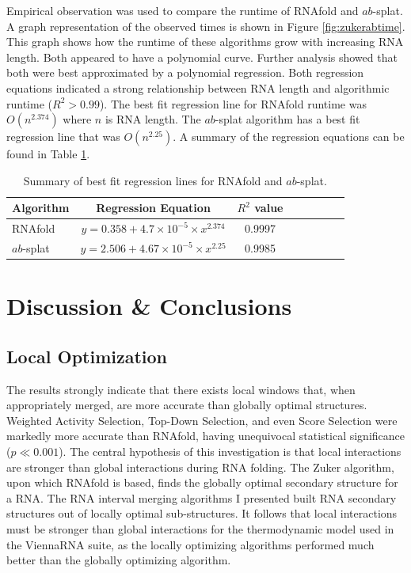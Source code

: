 \documentclass{cshonours}
\begin{document}
Empirical observation was used to compare the runtime of RNAfold and $ab$-splat. A graph representation of the observed times is shown in Figure \ref{fig:zukerabtime}. This graph shows how the runtime of these algorithms grow with increasing RNA length. Both appeared to have a polynomial curve. Further analysis showed that both were best approximated by a polynomial regression. Both regression equations indicated a strong relationship between RNA length and algorithmic runtime ($R^2 > 0.99$). The best fit regression line for RNAfold runtime was $O(n^{2.374})$ where $n$ is RNA length. The $ab$-splat algorithm has a best fit regression line that was $O(n^{2.25})$. A summary of the regression equations can be found in Table \ref{tab:algorithmtimeregression}.


\begin{table}
\centering
\begin{tabular}{l*{6}{c}r}
Algorithm	& Regression Equation & $R^2$ value \\
\hline
RNAfold &  $y=0.358+4.7 \times 10^{-5} \times x^{2.374}$    &    0.9997    \\
$ab$-splat & $y=2.506+ 4.67\times 10 ^{-5} \times x^{2.25}$    &    0.9985  \\
\end{tabular}

\caption{Summary of best fit regression lines for RNAfold and $ab$-splat.}
\label{tab:algorithmtimeregression}
\end{table}

\chapter{Discussion \& Conclusions}

\section{Local Optimization}
\label{sec:localopt}
The results strongly indicate that there exists local windows that, when appropriately merged, are more accurate than globally optimal structures. Weighted Activity Selection, Top-Down Selection, and even Score Selection were markedly more accurate than RNAfold, having unequivocal statistical significance ($p \ll 0.001$). The central hypothesis of this investigation is that local interactions are stronger than global interactions during RNA folding. The Zuker algorithm, upon which RNAfold is based, finds the globally optimal secondary structure for a RNA. The RNA interval merging algorithms I presented built RNA secondary structures out of locally optimal sub-structures. It follows that local interactions must be stronger than global interactions for the thermodynamic model used in the ViennaRNA suite, as the locally optimizing algorithms performed much better than the globally optimizing algorithm.
\end{document}
